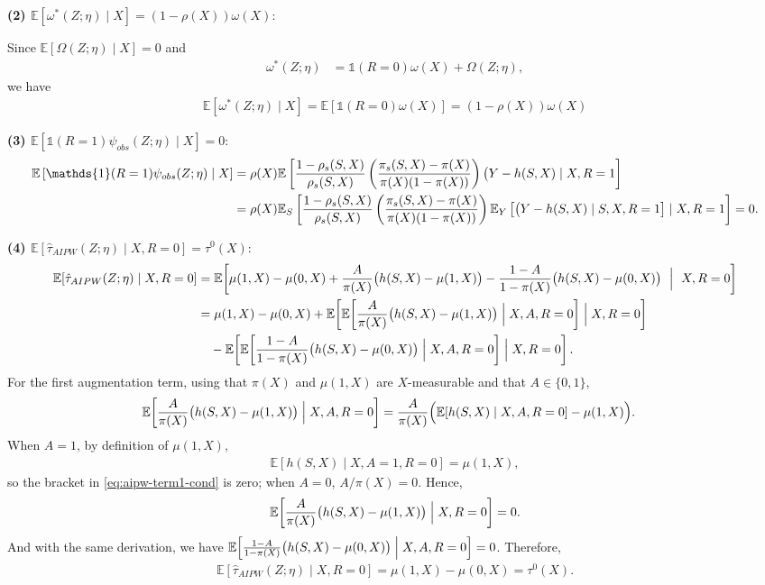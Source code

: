 \documentclass{article}
\theoremstyle{plain}
\theoremstyle{definition}
\theoremstyle{remark}
\newcommand{\E}{\mathbb{E}}                %
\newcommand{\1}{\mathds{1}}                %
\begin{document}
\textbf{(2) $\E\left[\omega^*(Z;\eta) \mid X\right]=(1-\rho(X))\omega(X)$}: 

Since $\E\left[\Omega(Z;\eta) \mid X\right]=0$ and
\begin{align}
    \omega^*(Z;\eta) &= \1(R=0) \omega(X) + \Omega(Z;\eta),
\end{align}
we have 
\begin{align}
    \E\left[\omega^*(Z;\eta) \mid X\right]= \E\left[\1(R=0) \omega(X)\right] = (1-\rho(X))\omega(X)
\end{align}

\textbf{(3)  $\E\left[\1(R=1)\psi_{obs}(Z;\eta) \mid X\right] = 0$}:
\begin{align}
\label{eq:psi-mean-zero-property}
    \E\left[\1(R=1)\psi_{obs}(Z;\eta) \mid X\right] &= \rho(X) \E\left[\frac{1-\rho_s(S,X)}{\rho_s(S,X)} \left( \frac{\pi_s(S,X) - \pi(X)}{\pi(X)(1-\pi(X))} \right) \big( Y - h(S,X) \mid X, R=1\right] \notag \\
    &= \rho(X) \E_S\left[ \frac{1-\rho_s(S,X)}{\rho_s(S,X)} \left( \frac{\pi_s(S,X) - \pi(X)}{\pi(X)(1-\pi(X))} \right)\E_Y\left[ \big( Y - h(S,X) \mid S, X, R=1\right] \mid X, R=1\right]=0.
\end{align}

\textbf{(4) $\E\left[\hat{\tau}_{AIPW}(Z;\eta)\mid X, R=0\right]=\tau^0(X)$}:
\begin{align}
\E\!\left[\hat{\tau}_{AIPW}(Z;\eta)\mid X, R=0\right]
&=\E\!\left[
\mu(1,X)-\mu(0,X)
+\frac{A}{\pi(X)}\big(h(S,X)-\mu(1,X)\big)
-\frac{1-A}{1-\pi(X)}\big(h(S,X)-\mu(0,X)\big)
\ \Bigm|\ X,R=0\right] \notag\\
&=\mu(1,X)-\mu(0,X)
+\E\!\left[
\E\!\left[\frac{A}{\pi(X)}\big(h(S,X)-\mu(1,X)\big)\Bigm|X,A,R=0\right]
\Bigm|X,R=0\right] \notag\\
&\quad
-\E\!\left[
\E\!\left[\frac{1-A}{1-\pi(X)}\big(h(S,X)-\mu(0,X)\big)\Bigm|X,A,R=0\right]
\Bigm|X,R=0\right]. \notag
\end{align}
For the first augmentation term, using that $\pi(X)$ and $\mu(1,X)$ are $X$-measurable and that $A\in\{0,1\}$,
\begin{align}
\E\!\left[\frac{A}{\pi(X)}\big(h(S,X)-\mu(1,X)\big)\Bigm|X,A,R=0\right]
&=\frac{A}{\pi(X)}\Big(\E[h(S,X)\mid X,A,R=0]-\mu(1,X)\Big).\label{eq:aipw-term1-cond}
\end{align}
When $A=1$, by definition of $\mu(1,X)$,
\begin{align}
\E[h(S,X)\mid X,A=1,R=0]=\mu(1,X),
\end{align}
so the bracket in \eqref{eq:aipw-term1-cond} is zero; when $A=0$,  $A/\pi(X)=0$. Hence,
\begin{align}
\E\!\left[\frac{A}{\pi(X)}\big(h(S,X)-\mu(1,X)\big)\Bigm|X,R=0\right]=0.
\label{eq:aipw-term1-zero}
\end{align}
And with the same derivation, we have $\E\!\left[\frac{1-A}{1-\pi(X)}\big(h(S,X)-\mu(0,X)\big)\Bigm|X,A,R=0\right]=0$.
Therefore, 
\begin{align}
\label{eq:tau-AIPW-mean-tau}
\E\!\left[\hat{\tau}_{AIPW}(Z;\eta)\mid X, R=0\right]
=\mu(1,X)-\mu(0,X)=\tau^0(X).
\end{align}
\end{document}
